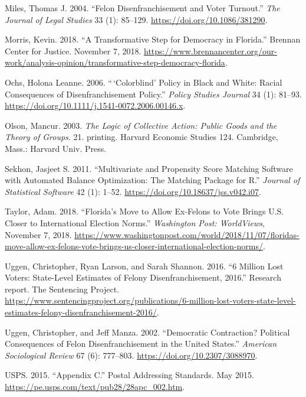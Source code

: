 \documentclass[
  12pt,
]{article}
\newlength{\cslhangindent}
\newenvironment{cslreferences}%
  {\setlength{\parindent}{0pt}%
  \everypar{\setlength{\hangindent}{\cslhangindent}}\ignorespaces}%
  {\par}
\begin{document}
\begin{cslreferences}
\leavevmode\hypertarget{ref-Miles2004}{}%
Miles, Thomas J. 2004. ``Felon Disenfranchisement and Voter Turnout.'' \emph{The Journal of Legal Studies} 33 (1): 85--129. \url{https://doi.org/10.1086/381290}.

\leavevmode\hypertarget{ref-Morris2018}{}%
Morris, Kevin. 2018. ``A Transformative Step for Democracy in Florida.'' Brennan Center for Justice. November 7, 2018. \url{https://www.brennancenter.org/our-work/analysis-opinion/transformative-step-democracy-florida}.

\leavevmode\hypertarget{ref-Ochs2006}{}%
Ochs, Holona Leanne. 2006. ``\,`Colorblind' Policy in Black and White: Racial Consequences of Disenfranchisement Policy.'' \emph{Policy Studies Journal} 34 (1): 81--93. \url{https://doi.org/10.1111/j.1541-0072.2006.00146.x}.

\leavevmode\hypertarget{ref-Olson2003}{}%
Olson, Mancur. 2003. \emph{The Logic of Collective Action: Public Goods and the Theory of Groups}. 21. printing. Harvard Economic Studies 124. Cambridge, Mass.: Harvard Univ. Press.

\leavevmode\hypertarget{ref-Sekhon2011}{}%
Sekhon, Jasjeet S. 2011. ``Multivariate and Propensity Score Matching Software with Automated Balance Optimization: The Matching Package for R.'' \emph{Journal of Statistical Software} 42 (1): 1--52. \url{https://doi.org/10.18637/jss.v042.i07}.

\leavevmode\hypertarget{ref-Taylor2018}{}%
Taylor, Adam. 2018. ``Florida's Move to Allow Ex-Felons to Vote Brings U.S. Closer to International Election Norms.'' \emph{Washington Post: WorldViews}, November 7, 2018. \url{https://www.washingtonpost.com/world/2018/11/07/floridas-move-allow-ex-felons-vote-brings-us-closer-international-election-norms/}.

\leavevmode\hypertarget{ref-sentencing_2016}{}%
Uggen, Christopher, Ryan Larson, and Sarah Shannon. 2016. ``6 Million Lost Voters: State-Level Estimates of Felony Disenfranchisement, 2016.'' Research report. The Sentencing Project. \url{https://www.sentencingproject.org/publications/6-million-lost-voters-state-level-estimates-felony-disenfranchisement-2016/}.

\leavevmode\hypertarget{ref-Uggen2002}{}%
Uggen, Christopher, and Jeff Manza. 2002. ``Democratic Contraction? Political Consequences of Felon Disenfranchisement in the United States.'' \emph{American Sociological Review} 67 (6): 777--803. \url{https://doi.org/10.2307/3088970}.

\leavevmode\hypertarget{ref-USPS2015}{}%
USPS. 2015. ``Appendix C.'' Postal Addressing Standards. May 2015. \url{https://pe.usps.com/text/pub28/28apc_002.htm}.


\end{cslreferences}
\end{document}
